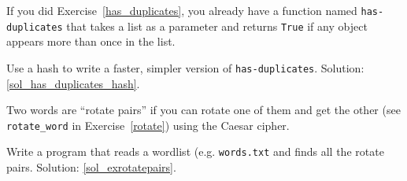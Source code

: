 \begin{exercise}
\label{has_duplicates_hash}

If you did Exercise~\ref{has_duplicates}, you already have
a function named \verb"has-duplicates" that takes a list
as a parameter and returns {\tt True} if any object
appears more than once in the list.

Use a hash to write a faster, simpler version of
\verb"has-duplicates". 
Solution: \ref{sol_has_duplicates_hash}.

\end{exercise}


\begin{exercise}
\label{exrotatepairs}

Two words are ``rotate pairs'' if you can rotate one of them
and get the other (see \verb"rotate_word" in 
Exercise~\ref{rotate}) using the Caesar cipher.

Write a program that reads a wordlist (e.g. {\tt words.txt} 
and finds all the rotate pairs.  
Solution: \ref{sol_exrotatepairs}.

\end{exercise}


